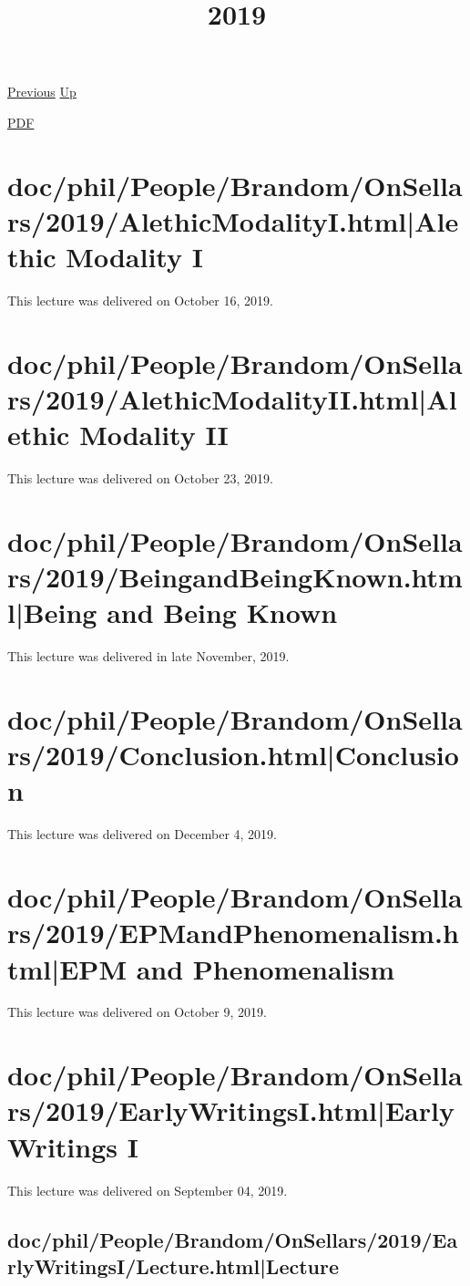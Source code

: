 \documentclass[12pt,a4paper]{report}
\begin{document}
 \href{doc/phil/People/Brandom/OnSellars/2009.html}{Previous} 
 \href{doc/phil/People/Brandom/OnSellars.html}{Up} 

 \href{doc/phil/People/Brandom/OnSellars/2019.pdf}{PDF} 
\title{2019}

\tableofcontents

\part{doc/phil/People/Brandom/OnSellars/2019/AlethicModalityI.html|Alethic Modality I}
This lecture was delivered on October 16, 2019.

\part{doc/phil/People/Brandom/OnSellars/2019/AlethicModalityII.html|Alethic Modality II}
This lecture was delivered on October 23, 2019.

\part{doc/phil/People/Brandom/OnSellars/2019/BeingandBeingKnown.html|Being and Being Known}
This lecture was delivered in late November, 2019.

\part{doc/phil/People/Brandom/OnSellars/2019/Conclusion.html|Conclusion}
This lecture was delivered on December 4, 2019.

\part{doc/phil/People/Brandom/OnSellars/2019/EPMandPhenomenalism.html|EPM and Phenomenalism}
This lecture was delivered on October 9, 2019.

\part{doc/phil/People/Brandom/OnSellars/2019/EarlyWritingsI.html|Early Writings I}
This lecture was delivered on September 04, 2019.

\chapter{doc/phil/People/Brandom/OnSellars/2019/EarlyWritingsI/Lecture.html|Lecture}
\end{document}
